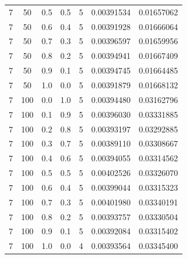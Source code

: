 \documentclass[12pt, a4paper]{report}
\begin{document}
\begin{table} [H]
\begin{tabular}[l]{|c c c c c c c|}
			7 & 50 & 0.5 & 0.5 & 5 & 0.00391534 & 0.01657062 \\
			
			7 & 50 & 0.6 & 0.4 & 5 & 0.00391928 & 0.01666064 \\
			
			7 & 50 & 0.7 & 0.3 & 5 & 0.00396597 & 0.01659956 \\
			
			7 & 50 & 0.8 & 0.2 & 5 & 0.00394941 & 0.01667409 \\
			
			7 & 50 & 0.9 & 0.1 & 5 & 0.00394745 & 0.01664485 \\
			
			7 & 50 & 1.0 & 0.0 & 5 & 0.00391879 & 0.01668132 \\
			
			7 & 100 & 0.0 & 1.0 & 5 & 0.00394480 & 0.03162796 \\
			
			7 & 100 & 0.1 & 0.9 & 5 & 0.00396030 & 0.03331885 \\
			
			7 & 100 & 0.2 & 0.8 & 5 & 0.00393197 & 0.03292885 \\
			
			7 & 100 & 0.3 & 0.7 & 5 & 0.00389110 & 0.03308667 \\
			
			7 & 100 & 0.4 & 0.6 & 5 & 0.00394055 & 0.03314562 \\
			
			7 & 100 & 0.5 & 0.5 & 5 & 0.00402526 & 0.03326070 \\
			
			7 & 100 & 0.6 & 0.4 & 5 & 0.00399044 & 0.03315323 \\
			
			7 & 100 & 0.7 & 0.3 & 5 & 0.00401980 & 0.03340191 \\
			
			7 & 100 & 0.8 & 0.2 & 5 & 0.00393757 & 0.03330504 \\
			
			7 & 100 & 0.9 & 0.1 & 5 & 0.00392084 & 0.03315402 \\
			
			7 & 100 & 1.0 & 0.0 & 4 & 0.00393564 & 0.03345400 \\\hline
		\end{tabular}
	\end{table}
	
\end{document}
